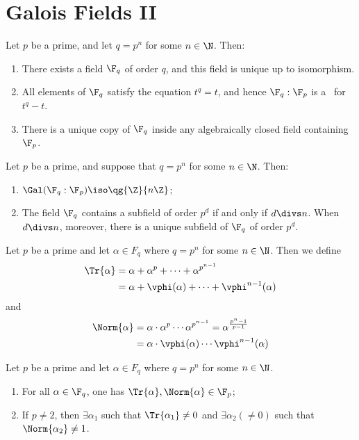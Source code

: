 \documentclass[a4paper]{article}
\begin{document}
\section{Galois Fields II}

\begin{ttheorem}
  Let $ p $ be a prime, and let $ q=p^n $ for some $ n\in \N $.
  Then: \begin{enumerate}[label=(\alph*)]
    \item There exists a field $ \F_q $ of order $ q $, and this field is unique up to isomorphism.
    \item All elements of $ \F_q $ satisfy the equation $ t^q=t $, and hence $ \F_q:\F_p $ is a \sfe~for $ t^q-t $.
    \item There is a unique copy of $ \F_q $ inside any algebraically closed field containing $ \F_p $.
  \end{enumerate}
\end{ttheorem}

\begin{ttheorem}
  Let \( p \) be a prime, and suppose that \( q=p^{n} \) for some \( n\in\N \).
  Then: \begin{enumerate}[label=(\alph*)]
    \item $ \Gal(\F_q:\F_p)\iso \qg{\Z}{n\Z} $;
    \item The field $ \F_q $ contains a subfield of order $ p^d $ if and only if $ d\divs n $.
      When $ d\divs n $, moreover, there is a unique subfield of $ \F_q $ of order $ p^d $.
  \end{enumerate}
\end{ttheorem}

\begin{tdefinition}
  Let \( p \) be a prime and let \( \alpha\in F_q \) where \( q=p^{n} \) for some \( n\in\N \).
  Then we define
  \begin{align*}
    \Tr{\alpha} &= \alpha+\alpha^p + \cdots + \alpha^{p^{n-1}} \\
    &= \alpha + \vphi(\alpha) + \cdots + \vphi^{n-1}(\alpha)
  \end{align*}
  and
  \begin{align*}
    \Norm{\alpha} &= \alpha\cdot\alpha^p  \cdots  \alpha^{p^{n-1}} = \alpha^{\frac{p^{n}-1}{p-1}} \\
    &= \alpha\cdot \vphi(\alpha)\cdots \vphi^{n-1}(\alpha)
  \end{align*}
\end{tdefinition}

\begin{tlemma}
  Let \( p \) be a prime and let \( \alpha\in F_q \) where \( q=p^{n} \) for some \( n\in\N \).
  \begin{enumerate}
    \item For all \( \alpha\in \F_q \), one has \( \Tr{\alpha},\Norm{\alpha}\in \F_p \);
    \item If \( p\neq 2 \), then \( \exists\alpha_1 \) such that \( \Tr{\alpha_1}\neq 0 \) and \( \exists \alpha_2(\neq 0) \) such that \( \Norm{\alpha_2}\neq 1 \).
  \end{enumerate}
\end{tlemma}
\end{document}
